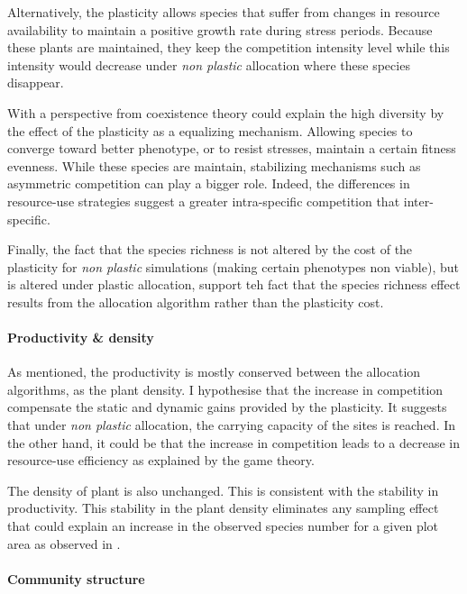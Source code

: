 Alternatively, the plasticity allows species that suffer from changes in resource availability to maintain a positive growth rate during stress periods. Because these plants are maintained, they keep the competition intensity level while this intensity would decrease under \textit{non plastic} allocation where these species disappear. 

With a perspective from coexistence theory could explain the high diversity by the effect of the plasticity as a equalizing mechanism. Allowing species to converge toward better phenotype, or to resist stresses, maintain a certain fitness evenness. While these species are maintain, stabilizing mechanisms such as asymmetric competition can play a bigger role. Indeed, the differences in resource-use strategies suggest a greater intra-specific competition that inter-specific.

Finally, the fact that the species richness is not altered by the cost of the plasticity for \textit{non plastic} simulations (making certain phenotypes non viable), but is altered under plastic allocation, support teh fact that the species richness effect results from the allocation algorithm rather than the plasticity cost.


\paragraph{Productivity \& density}

As mentioned, the productivity is mostly conserved between the allocation algorithms, as the plant density. I hypothesise that the increase in competition compensate the static and dynamic gains provided by the plasticity. It suggests that under \textit{non plastic} allocation, the carrying capacity of the sites is reached. In the other hand, it could be that the increase in competition leads to a decrease in resource-use efficiency as explained by the game theory.

The density of plant is also unchanged. This is consistent with the stability in productivity. This stability in the plant density eliminates any sampling effect that could explain an increase in the observed species number for a given plot area as observed in \cite{lepik_high_2005}.


\paragraph{Community structure}

